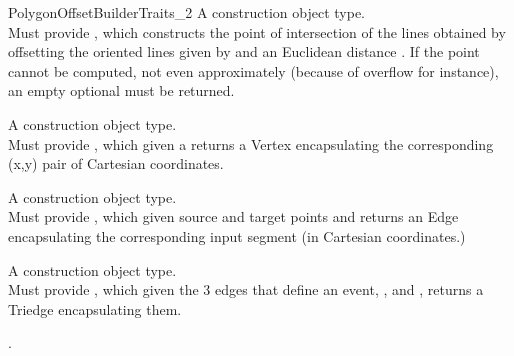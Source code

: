 \begin{ccRefConcept}{PolygonOffsetBuilderTraits_2}
{A construction object type.\\
Must provide , which constructs the point of intersection of the lines obtained by offsetting the oriented lines given by  and  an Euclidean distance .
If the point cannot be computed, not even approximately (because of overflow for instance), an empty optional must be returned.\\ 
}

{A construction object type.\\
Must provide , which given a   returns a Vertex encapsulating the corresponding (x,y) pair of Cartesian coordinates.}

{A construction object type.\\
Must provide , which given source and target points  and  returns an Edge encapsulating the corresponding input segment (in Cartesian coordinates.)}

{A construction object type.\\
Must provide , which given the 3 edges that define an event, ,  and , returns a Triedge encapsulating them.}

\ccHasModels

.

\ccSeeAlso

\\
\\

\end{ccRefConcept}


